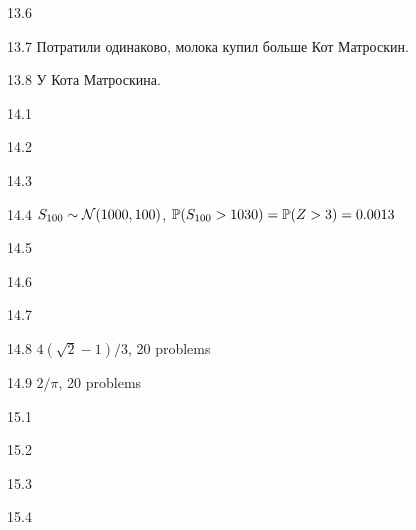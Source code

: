 \protect \hypertarget {soln:13.6}{}
\begin{solution}{{13.6}}
\end{solution}
\protect \hypertarget {soln:13.7}{}
\begin{solution}{{13.7}}
    Потратили одинаково, молока купил больше Кот Матроскин.
\end{solution}
\protect \hypertarget {soln:13.8}{}
\begin{solution}{{13.8}}
    У Кота Матроскина.
\end{solution}
\protect \hypertarget {soln:14.1}{}
\begin{solution}{{14.1}}
\end{solution}
\protect \hypertarget {soln:14.2}{}
\begin{solution}{{14.2}}
\end{solution}
\protect \hypertarget {soln:14.3}{}
\begin{solution}{{14.3}}
\end{solution}
\protect \hypertarget {soln:14.4}{}
\begin{solution}{{14.4}}
  $S_{100} \sim \cN(1000, 100)$, $\P(S_{100}>1030)=\P(Z>3)=0.0013$
\end{solution}
\protect \hypertarget {soln:14.5}{}
\begin{solution}{{14.5}}
\end{solution}
\protect \hypertarget {soln:14.6}{}
\begin{solution}{{14.6}}
\end{solution}
\protect \hypertarget {soln:14.7}{}
\begin{solution}{{14.7}}
\end{solution}
\protect \hypertarget {soln:14.8}{}
\begin{solution}{{14.8}}
  $4(\sqrt{2}-1)/3$, 20 problems
\end{solution}
\protect \hypertarget {soln:14.9}{}
\begin{solution}{{14.9}}
  $2/\pi$, 20 problems
\end{solution}
\protect \hypertarget {soln:15.1}{}
\begin{solution}{{15.1}}
\end{solution}
\protect \hypertarget {soln:15.2}{}
\begin{solution}{{15.2}}
\end{solution}
\protect \hypertarget {soln:15.3}{}
\begin{solution}{{15.3}}
\end{solution}
\protect \hypertarget {soln:15.4}{}
\begin{solution}{{15.4}}
\end{solution}
